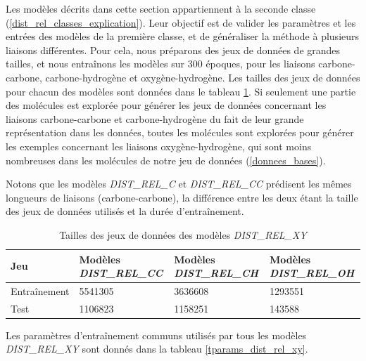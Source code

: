\label{dist_rel_generalisation}

\par Les modèles décrits dans cette section appartiennent à la seconde classe (\ref{dist_rel_classes_explication}). Leur objectif est de valider les paramètres et les entrées des modèles de la première classe, et de généraliser la méthode à plusieurs liaisons différentes. Pour cela, nous préparons des jeux de données de grandes tailles, et nous entraînons les modèles sur 300 époques, pour les liaisons carbone-carbone, carbone-hydrogène et oxygène-hydrogène. Les tailles des jeux de données pour chacun des modèles sont données dans le tableau \ref{t_tailles_dist_rel_xy}. Si seulement une partie des molécules est explorée pour générer les jeux de données concernant les liaisons carbone-carbone et carbone-hydrogène du fait de leur grande représentation dans les données, toutes les molécules sont explorées pour générer les exemples concernant les liaisons oxygène-hydrogène, qui sont moins nombreuses dans les molécules de notre jeu de données (\ref{donnees_bases}).
\par Notons que les modèles \emph{DIST\_REL\_C} et \emph{DIST\_REL\_CC} prédisent les mêmes longueurs de liaisons (carbone-carbone), la différence entre les deux étant la taille des jeux de données utilisés et la durée d'entraînement.

\begin{table}
	\centering
		\begin{tabular}{|l|l|l|l|}
			\hline
			\textbf{Jeu} & \textbf{Modèles \emph{DIST\_REL\_CC}} & \textbf{Modèles \emph{DIST\_REL\_CH}} & \textbf{Modèles \emph{DIST\_REL\_OH}} \\ \hline
			Entraînement & 5541305 & 3636608 & 1293551 \\ \hline
			Test & 1106823 & 1158251 & 143588 \\ \hline
		\end{tabular}

	\caption{Tailles des jeux de données des modèles \emph{DIST\_REL\_XY}}
	\label{t_tailles_dist_rel_xy}
\end{table}

Les paramètres d'entraînement communs utilisés par tous les modèles \emph{DIST\_REL\_XY} sont donnés dans la tableau \ref{tparams_dist_rel_xy}.

